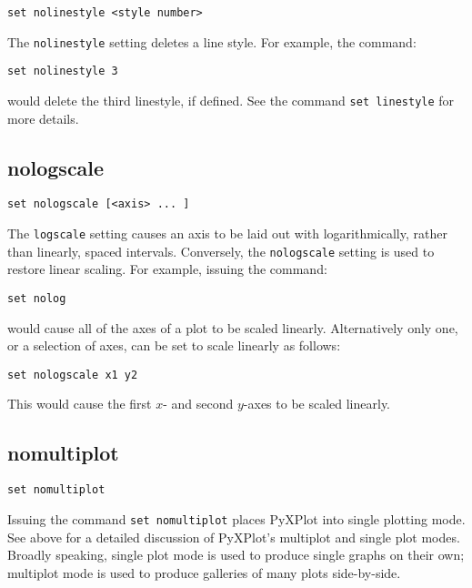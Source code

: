 \begin{verbatim}
set nolinestyle <style number>
\end{verbatim}

The {\tt nolinestyle} setting deletes a line style. For example, the command:

\begin{verbatim}
set nolinestyle 3
\end{verbatim}

\noindent would delete the third linestyle, if defined. See the command {\tt set
linestyle} for more details.


\subsection{nologscale}

\begin{verbatim}
set nologscale [<axis> ... ]
\end{verbatim}

The {\tt logscale} setting causes an axis to be laid out with logarithmically,
rather than linearly, spaced intervals. Conversely, the {\tt nologscale} setting
is used to restore linear scaling. For example, issuing the command:

\begin{verbatim}
set nolog 
\end{verbatim}

\noindent would cause all of the axes of a plot to be scaled linearly. Alternatively only one,
or a selection of axes, can be set to scale linearly as follows:

\begin{verbatim}
set nologscale x1 y2
\end{verbatim}

This would cause the first $x$- and second $y$-axes to be scaled linearly.


\subsection{nomultiplot}

\begin{verbatim}
set nomultiplot
\end{verbatim}

Issuing the command {\tt set nomultiplot} places PyXPlot into single plotting
mode.  See above for a detailed discussion of PyXPlot's multiplot and
single plot modes. Broadly speaking, single plot mode is used to produce single
graphs on their own; multiplot mode is used to produce galleries of many plots
side-by-side.


